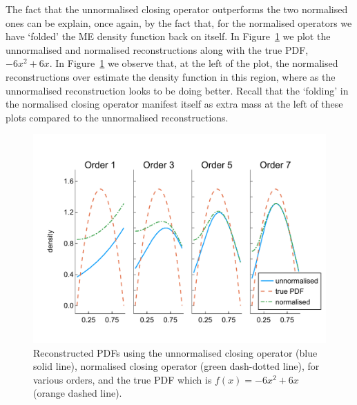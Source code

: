 \begin{example}
The fact that the unnormalised closing operator outperforms the two normalised ones can be explain, once again, by the fact that, for the normalised operators we have `folded' the ME density function back on itself. In Figure~\ref{fig: pdf reconstructed quadratic} we plot the unnormalised and normalised reconstructions along with the true PDF, \(-6x^2+6x\). In Figure~\ref{fig: pdf reconstructed quadratic} we observe that, at the left of the plot, the normalised reconstructions over estimate the density function in this region, where as the unnormalised reconstruction looks to be doing better. Recall that the `folding' in the normalised closing operator manifest itself as extra mass at the left of these plots compared to the unnormalised reconstructions. 
\begin{figure}
	\centering
	\includegraphics[width=\textwidth]{chapter6/figs/qbdrap_closing_vec/fun6/pdfs_formatted.pdf}
	\caption{Reconstructed PDFs using the unnormalised closing operator (blue solid line), normalised closing operator (green dash-dotted line), for various orders, and the true PDF which is \(f(x)=-6x^2+6x\) (orange dashed line).}
	\label{fig: pdf reconstructed quadratic}
\end{figure} 
\end{example}

